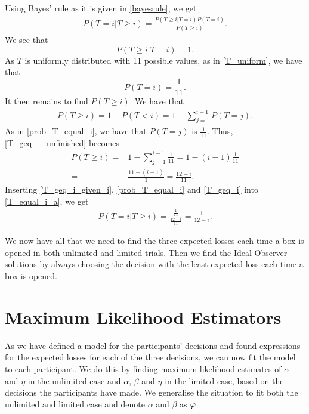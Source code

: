 Using Bayes' rule as it is given in \eqref{bayesrule}, we get
\begin{equation}
\label{T_equal_i_a}
    \begin{aligned}
        P(T=i|T\geq i) = \frac{P(T\geq i|T=i)P(T=i)}{P(T\geq i)}.
    \end{aligned}
\end{equation}
We see that 
\begin{equation}
\label{T_geq_i_given_i}
    P(T\geq i|T=i) = 1.
\end{equation}
As $T$ is uniformly distributed with 11 possible values, as in \eqref{T_uniform}, we have that
\begin{equation}
\label{prob_T_equal_i}
    P(T=i) = \frac{1}{11}.
\end{equation}
It then remains to find $P(T\geq i)$. We have that
\begin{equation}
\label{T_geq_i_unfinished}
    \begin{aligned}
        P(T\geq i) = 1 - P(T<i) = 1 - \sum_{j=1}^{i-1}P(T=j).
    \end{aligned}
\end{equation}
As in \eqref{prob_T_equal_i}, we have that $P(T=j)$ is $\frac{1}{11}$. Thus, \eqref{T_geq_i_unfinished} becomes
\begin{equation}
\label{T_geq_i}
    \begin{aligned}
        P(T\geq i) =& 1-\sum_{j=1}^{i-1} \frac{1}{11} = 1- (i-1)\frac{1}{11}\\[6pt]
        =& \frac{11-(i-1)}{1} = \frac{12-i}{11}.
    \end{aligned}
\end{equation}
Inserting \eqref{T_geq_i_given_i}, \eqref{prob_T_equal_i} and \eqref{T_geq_i} into \eqref{T_equal_i_a}, we get 
\begin{equation}
    \begin{aligned}
        P(T=i|T\geq i) = \frac{\frac{1}{11}}{\frac{12-i}{11}} = \frac{1}{12-i}.
    \end{aligned}
\end{equation}

We now have all that we need to find the three expected losses each time a box is opened in both unlimited and limited trials. Then we find the Ideal Observer solutions by always choosing the decision with the least expected loss each time a box is opened. 



\section{Maximum Likelihood Estimators}
\label{section:mles}
As we have defined a model for the participants' decisions and found expressions for the expected losses for each of the three decisions, we can now fit the model to each participant. We do this by finding maximum likelihood estimates of $\alpha$ and $\eta$ in the unlimited case and $\alpha$, $\beta$ and $\eta$ in the limited case, based on the decisions the participants have made. We generalise the situation to fit both the unlimited and limited case and denote $\alpha$ and $\beta$ as $\varphi$. 

